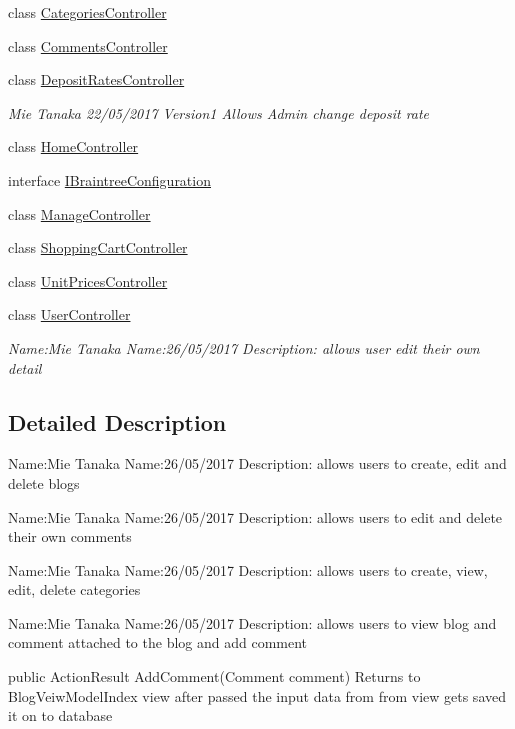 \begin{DoxyCompactItemize}
class \hyperlink{class_alfa_accounting_1_1_controllers_1_1_categories_controller}{Categories\+Controller}
\item 
class \hyperlink{class_alfa_accounting_1_1_controllers_1_1_comments_controller}{Comments\+Controller}
\item 
class \hyperlink{class_alfa_accounting_1_1_controllers_1_1_deposit_rates_controller}{Deposit\+Rates\+Controller}
\begin{DoxyCompactList}\small\item\em Mie Tanaka 22/05/2017 Version1 Allows Admin change deposit rate \end{DoxyCompactList}\item 
class \hyperlink{class_alfa_accounting_1_1_controllers_1_1_home_controller}{Home\+Controller}
\item 
interface \hyperlink{interface_alfa_accounting_1_1_controllers_1_1_i_braintree_configuration}{I\+Braintree\+Configuration}
\item 
class \hyperlink{class_alfa_accounting_1_1_controllers_1_1_manage_controller}{Manage\+Controller}
\item 
class \hyperlink{class_alfa_accounting_1_1_controllers_1_1_shopping_cart_controller}{Shopping\+Cart\+Controller}
\item 
class \hyperlink{class_alfa_accounting_1_1_controllers_1_1_unit_prices_controller}{Unit\+Prices\+Controller}
\item 
class \hyperlink{class_alfa_accounting_1_1_controllers_1_1_user_controller}{User\+Controller}
\begin{DoxyCompactList}\small\item\em Name\+:Mie Tanaka Name\+:26/05/2017 Description\+: allows user edit their own detail \end{DoxyCompactList}\end{DoxyCompactItemize}


\subsection{Detailed Description}
Name\+:Mie Tanaka Name\+:26/05/2017 Description\+: allows users to create, edit and delete blogs 

Name\+:Mie Tanaka Name\+:26/05/2017 Description\+: allows users to edit and delete their own comments

Name\+:Mie Tanaka Name\+:26/05/2017 Description\+: allows users to create, view, edit, delete categories

Name\+:Mie Tanaka Name\+:26/05/2017 Description\+: allows users to view blog and comment attached to the blog and add comment

public Action\+Result Add\+Comment(\+Comment comment) Returns to Blog\+Veiw\+Model\+Index view after passed the input data from from view gets saved it on to database 